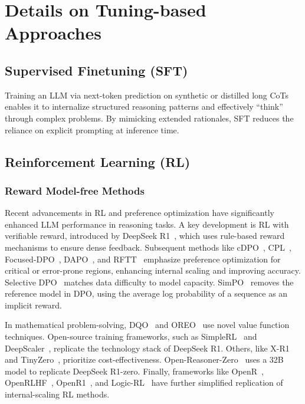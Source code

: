 \section{Details on Tuning-based Approaches}
\label{app:tuning}

\subsection{Supervised Finetuning (SFT)}
\label{app:sft}
Training an LLM via next-token prediction on synthetic or distilled long CoTs enables it to internalize structured reasoning patterns and effectively “think” through complex problems. By mimicking extended rationales, SFT reduces the reliance on explicit prompting at inference time. 

\subsection{Reinforcement Learning (RL)}
\label{app:rl}

\subsubsection{Reward Model-free Methods}
Recent advancements in RL and preference optimization have significantly enhanced LLM performance in reasoning tasks. 
A key development is RL with verifiable reward, introduced by DeepSeek R1~\citep{deepseek-r1}, which uses rule-based reward mechanisms to ensure dense feedback. 
Subsequent methods like cDPO~\citep{lin2024critical}, CPL~\citep{wang2024cpl}, Focused-DPO~\citep{zhang2025focused}, DAPO~\citep{liu2024improvingmultistepreasoningabilities}, and RFTT~\citep{zhang2025reasoning} emphasize preference optimization for critical or error-prone regions, enhancing internal scaling and improving accuracy. 
Selective DPO~\citep{gao2025principled} matches data difficulty to model capacity. 
SimPO~\citep{meng2024simpo} removes the reference model in DPO, using the average log probability of a sequence as an implicit reward.

In mathematical problem-solving, DQO~\citep{ji2024enhancing} and OREO~\citep{wang2024offline} use novel value function techniques. Open-source training frameworks, such as SimpleRL~\citep{zeng2025simplerl} and DeepScaler~\citep{deepscaler2025}, replicate the technology stack of DeepSeek R1. Others, like X-R1~\citep{xr12025} and TinyZero~\citep{tinyzero}, prioritize cost-effectiveness. Open-Reasoner-Zero~\citep{OpenReasonerZero2025} uses a 32B model to replicate DeepSeek R1-zero. Finally, frameworks like OpenR~\citep{wang2024openr}, OpenRLHF~\citep{hu2024openrlhf}, OpenR1~\citep{openr1}, and Logic-RL~\citep{xie2025logic} have further simplified replication of internal-scaling RL methods.

